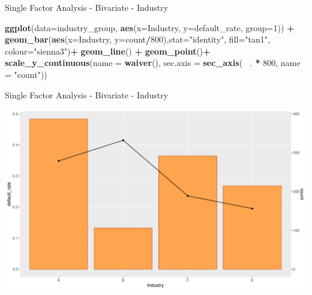 \documentclass[9pt,ignorenonframetext,]{beamer}
\newenvironment{Shaded}{\begin{snugshade}}{\end{snugshade}}
\newcommand{\KeywordTok}[1]{\textcolor[rgb]{0.13,0.29,0.53}{\textbf{#1}}}
\newcommand{\DataTypeTok}[1]{\textcolor[rgb]{0.13,0.29,0.53}{#1}}
\newcommand{\DecValTok}[1]{\textcolor[rgb]{0.00,0.00,0.81}{#1}}
\newcommand{\StringTok}[1]{\textcolor[rgb]{0.31,0.60,0.02}{#1}}
\newcommand{\OperatorTok}[1]{\textcolor[rgb]{0.81,0.36,0.00}{\textbf{#1}}}
\newcommand{\NormalTok}[1]{#1}
\begin{document}
\begin{frame}[fragile]{Single Factor Analysis - Bivariate - Industry}

\begin{Shaded}
\begin{Highlighting}[]
\KeywordTok{ggplot}\NormalTok{(}\DataTypeTok{data=}\NormalTok{industry_group, }\KeywordTok{aes}\NormalTok{(}\DataTypeTok{x=}\NormalTok{Industry, }\DataTypeTok{y=}\NormalTok{default_rate,}
                                \DataTypeTok{group=}\DecValTok{1}\NormalTok{)) }\OperatorTok{+}
\StringTok{    }\KeywordTok{geom_bar}\NormalTok{(}\KeywordTok{aes}\NormalTok{(}\DataTypeTok{x=}\NormalTok{Industry, }\DataTypeTok{y=}\NormalTok{count}\OperatorTok{/}\DecValTok{800}\NormalTok{),}\DataTypeTok{stat=}\StringTok{"identity"}\NormalTok{,}
             \DataTypeTok{fill=}\StringTok{"tan1"}\NormalTok{, }\DataTypeTok{colour=}\StringTok{"sienna3"}\NormalTok{)}\OperatorTok{+}
\StringTok{    }\KeywordTok{geom_line}\NormalTok{() }\OperatorTok{+}
\StringTok{    }\KeywordTok{geom_point}\NormalTok{()}\OperatorTok{+}
\StringTok{    }\KeywordTok{scale_y_continuous}\NormalTok{(}\DataTypeTok{name =} \KeywordTok{waiver}\NormalTok{(),}
                       \DataTypeTok{sec.axis =} \KeywordTok{sec_axis}\NormalTok{(}\OperatorTok{~}\StringTok{ }\NormalTok{. }\OperatorTok{*}\StringTok{ }\DecValTok{800}\NormalTok{,}
                                           \DataTypeTok{name =} \StringTok{"count"}\NormalTok{))}
\end{Highlighting}
\end{Shaded}

\end{frame}

\begin{frame}{Single Factor Analysis - Bivariate - Industry}

\includegraphics{Risk-Models-Development-Process_files/figure-beamer/unnamed-chunk-20-1.pdf}

\end{frame}
\end{document}
